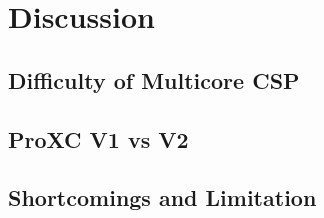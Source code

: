 

\chapter{Discussion}
\label{ch:discussion}

\section{Difficulty of Multicore CSP}

\section{ProXC V1 vs V2}

\section{Shortcomings and Limitation}
